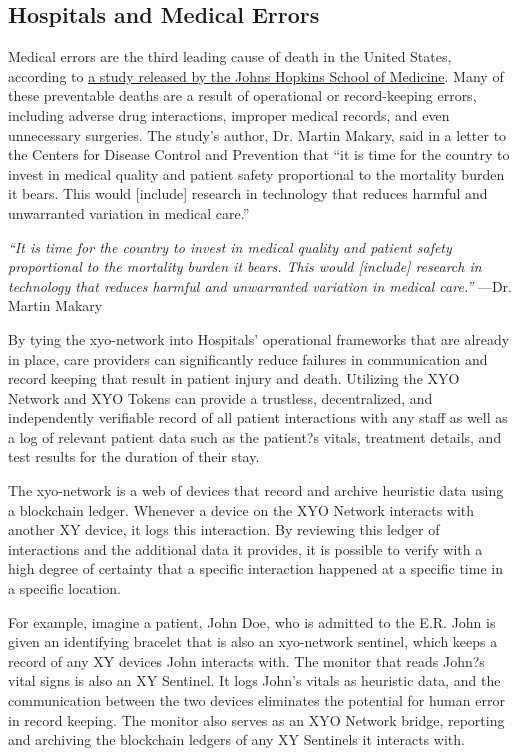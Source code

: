 \documentclass{article}
\begin{document}
\subsection{Hospitals and Medical Errors}
Medical errors are the third leading cause of death in the United States, according to \href{https://www.usnews.com/news/articles/2016-05-03/medical-errors-are-third-leading-cause-of-death-in-the-us}{a study released by the Johns Hopkins School of Medicine}. Many of these preventable deaths are a result of operational or record-keeping errors, including adverse drug interactions, improper medical records, and even unnecessary surgeries. The study's author, Dr. Martin Makary, said in a letter to the Centers for Disease Control and Prevention that ``it is time for the country to invest in medical quality and patient safety proportional to the mortality burden it bears. This would [include] research in technology that reduces harmful and unwarranted variation in medical care.''

\begin{displayquote}\textit{``It is time for the country to invest in medical quality and patient safety proportional to the mortality burden it bears. This would [include] research in technology that reduces harmful and unwarranted variation in medical care.''}
\vspace{2mm}
---Dr. Martin Makary
\end{displayquote}

By tying the \Gls{xyo-network} into Hospitals' operational frameworks that are already in place, care providers can significantly reduce failures in communication and record keeping that result in patient injury and death. Utilizing the XYO Network and XYO Tokens can provide a trustless, decentralized, and independently verifiable record of all patient interactions with any staff as well as a log of relevant patient data such as the patient?s vitals, treatment details, and test results for the duration of their stay.

The \Gls{xyo-network} is a web of devices that record and archive \gls{heuristic} data using a blockchain ledger. Whenever a device on the XYO Network interacts with another XY device, it logs this interaction. By reviewing this ledger of interactions and the additional data it  provides, it is possible to verify with a high degree of \gls{certainty} that a specific interaction happened at a specific time in a specific location.

For example, imagine a patient, John Doe, who is admitted to the E.R. John is given an identifying bracelet that is also an \Gls{xyo-network} \Gls{sentinel}, which keeps a record of any XY devices John interacts with. The monitor that reads John?s vital signs is also an XY Sentinel. It logs John's vitals as heuristic data, and the communication between the two devices eliminates the potential for human error in record keeping. The monitor also serves as an XYO Network \Gls{bridge}, reporting and archiving the blockchain ledgers of any XY Sentinels it interacts with.
\end{document}
